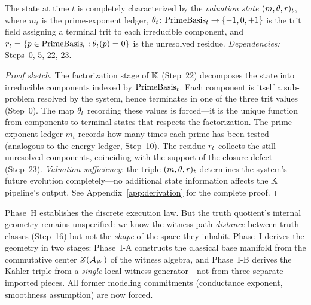 

\begin{theorem}
\label{thm:trit-field}
The state at time $t$ is completely characterized by the
\emph{valuation state} $(m, \theta, r)_t$, where $m_t$ is the prime-exponent
ledger, $\theta_t \colon \mathrm{PrimeBasis}_t \to \{-1, 0, +1\}$ is the
trit field assigning a terminal trit to each irreducible component, and
$r_t = \{p \in \mathrm{PrimeBasis}_t : \theta_t(p) = 0\}$ is the
unresolved residue.
\emph{Dependencies:} Steps~0, 5, 22, 23.
\begin{proof}[Proof sketch]
The factorization stage of $\mathbb{K}$ (Step~22) decomposes the state into
irreducible components indexed by $\mathrm{PrimeBasis}_t$.  Each component is
itself a sub-problem resolved by the system, hence terminates in one of
the three trit values (Step~0).  The map $\theta_t$ recording these
values is forced---it is the unique function from components to terminal
states that respects the factorization.  The prime-exponent ledger $m_t$
records how many times each prime has been tested (analogous to the energy
ledger, Step~10).  The residue $r_t$ collects the still-unresolved
components, coinciding with the support of the closure-defect (Step~23).
\emph{Valuation sufficiency}: the triple $(m, \theta, r)_t$ determines the
system's future evolution completely---no additional state information
affects the $\mathbb{K}$ pipeline's output.
See Appendix~\ref{app:derivation} for the complete proof.
\end{proof}
\end{theorem}

\bigskip\noindent
Phase~H establishes the discrete execution law.  But the truth
quotient's internal geometry remains unspecified: we know the witness-path
\emph{distance} between truth classes (Step~16) but not the
\emph{shape} of the space they inhabit.  Phase~I derives the geometry in
two stages: Phase~I-A constructs the classical base manifold from the
commutative center $Z(\mathcal{A}_W)$ of the witness algebra, and Phase~I-B
derives the K\"{a}hler triple from a \emph{single} local witness
generator---not from three separate imported pieces.  All former modeling
commitments (conductance exponent, smoothness assumption) are now forced.

